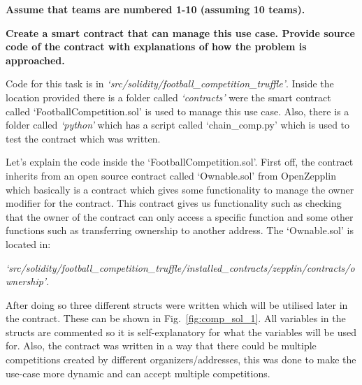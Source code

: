 \noindent
\textbf{Assume that teams are numbered 1-10 (assuming 10 teams).}

\noindent
\textbf{Create a smart contract that can manage this use case. Provide source code of the contract with explanations of how the problem is approached.} 

\noindent
Code for this task is in \textit{‘src/solidity/football\_competition\_truffle’}. Inside the location provided there is a folder called \textit{‘contracts’} were the smart contract called ‘FootballCompetition.sol’ is used to manage this use case. Also, there is a folder called \textit{‘python’} which has a script called ‘chain\_comp.py’ which is used to test the contract which was written. 

\noindent
Let’s explain the code inside the ‘FootballCompetition.sol’. First off, the contract inherits from an open source contract called ‘Ownable.sol’ from OpenZepplin \cite{solidity:openzepplin} which basically is a contract which gives some functionality to manage the owner modifier for the contract. This contract gives us functionality such as checking that the owner of the contract can only access a specific function and some other functions such as transferring ownership to another address. The ‘Ownable.sol’ is located in: 

\noindent
\textit{‘src/solidity/football\_competition\_truffle/installed\_contracts/zepplin/contracts/ownership’}.

\noindent
After doing so three different structs were written which will be utilised later in the contract. These can be shown in Fig.~\ref{fig:comp_sol_1}. All variables in the structs are commented so it is self-explanatory for what the variables will be used for. Also, the contract was written in a way that there could be multiple competitions created by different organizers/addresses, this was done to make the use-case more dynamic and can accept multiple competitions. 

